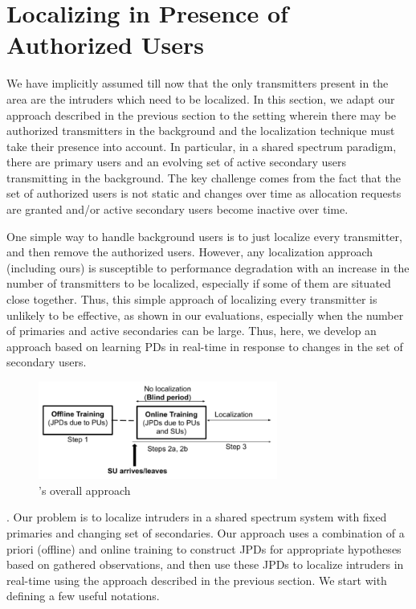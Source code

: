 \section{\texorpdfstring{\ouralgoss}: Localizing in Presence of Authorized Users}
\label{sec:auth}
\label{sec:mtlss}

We have implicitly assumed till now that the only transmitters present
in the area are the intruders which need to be localized.  In this
section, we adapt our \ouralgo approach described in the previous
section to the setting wherein there may be authorized transmitters in
the background and the localization technique must take their presence
into account. In particular, in a shared spectrum paradigm, there are
primary users and an evolving set of active secondary users
transmitting in the background. The key challenge comes from the fact
that the set of authorized users is not static and changes over time
as allocation requests are granted and/or active secondary users
become inactive over time.

One simple way to handle background users is to just localize every
transmitter, and then remove the authorized users. However, any
localization approach (including ours) is susceptible to performance
degradation with an increase in the number of transmitters to be localized,
especially if some of them are situated close together. Thus, this
simple approach of localizing every transmitter is unlikely to be
effective, as shown in our evaluations, especially when the number of
primaries and active secondaries can be large. Thus, here, we develop
an approach based on learning PDs in real-time in response to changes
in the set of secondary users.

\begin{figure}
	\centering
	\includegraphics[width=0.7\textwidth]{chapters/ipsn/figures/map**2.png}
	\caption{\ouralgoss's overall approach}
	\label{fig:auth}
\end{figure}

. Our problem
is to localize intruders in a shared spectrum system with fixed
primaries and changing set of secondaries.  Our \ouralgoss approach
uses a combination of a priori (offline) and online training to
construct JPDs for appropriate hypotheses based on gathered
observations, and then use these JPDs to localize intruders in
real-time using the \ouralgo approach described in the previous
section. We start with defining a few useful notations.

